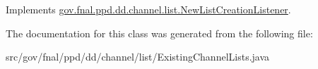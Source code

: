 Implements \hyperlink{interfacegov_1_1fnal_1_1ppd_1_1dd_1_1channel_1_1list_1_1NewListCreationListener_a453407f350d9eacded942c7336dd97c5}{gov.\-fnal.\-ppd.\-dd.\-channel.\-list.\-New\-List\-Creation\-Listener}.



The documentation for this class was generated from the following file\-:\begin{DoxyCompactItemize}
\item 
src/gov/fnal/ppd/dd/channel/list/Existing\-Channel\-Lists.\-java\end{DoxyCompactItemize}
